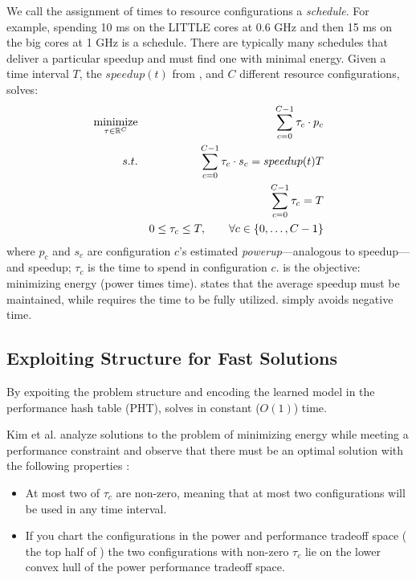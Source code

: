 We call the assignment of times to resource configurations a
\emph{schedule}. For example, spending 10 ms on the LITTLE cores at
0.6 GHz and then 15 ms on the big cores at 1 GHz is a schedule. There
are typically many schedules that deliver a particular speedup and
\SYSTEM{} must find one with minimal energy.  Given a time interval
$T$, the $speedup(t)$ from , and $C$ different
resource configurations, \SYSTEM{} solves:
\begin{eqnarray}
  \minimize_{\mathbf{\tau} \in \R^{C}} && \sum_{c=0}^{C-1} \tau_c \cdot p_c \label{eqn:power}  \\
  \st %
  && \sum_{c=0}^{C-1} \tau_c \cdot s_c =  speedup(t)T \label{eqn:work} \\
  && \sum_{c=0}^{C-1} \tau_c =  T \label{eqn:deadline} \\
  && 0 \le \tau_c \le T, \qquad \forall c \in \{0,\ldots,C-1\} \label{eqn:time}
\end{eqnarray}
where $p_c$ and $s_c$ are configuration $c$'s estimated
\emph{powerup}---analogous to speedup---and speedup; $\tau_c$ is the
time to spend in configuration $c$.   is the objective:
minimizing energy (power times time).   states that the
average speedup must be maintained, while  requires
the time to be fully utilized.   simply avoids negative
time.

\subsection{Exploiting Structure for Fast Solutions}
By expoiting the problem structure and encoding the learned model in
the performance hash table (PHT), \SYSTEM{} solves
 in constant ($O(1)$) time.

Kim et al. analyze solutions to the problem of minimizing energy while
meeting a performance constraint and observe that there must be an
optimal solution with the following properties \cite{kim-cpsna}:
\begin{itemize}[leftmargin=1em]
\item At most two of $\tau_c$ are non-zero, meaning that at most two
  configurations will be used in any time interval.
\item If you chart the configurations in the power and performance
  tradeoff space (\eg{} the top half of ) the two
  configurations with non-zero $\tau_c$ lie on the lower convex hull
  of the power performance tradeoff space.
\end{itemize}

